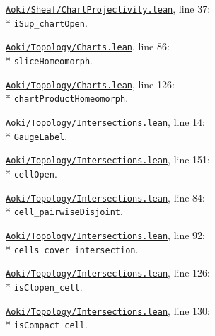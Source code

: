 \begin{leansources}
\item \href{../../../lean/Aoki/Sheaf/ChartProjectivity.lean}{\nolinkurl{Aoki/Sheaf/ChartProjectivity.lean}}, line 37:\\*
\nolinkurl{iSup_chartOpen}.
\item \href{../../../lean/Aoki/Topology/Charts.lean}{\nolinkurl{Aoki/Topology/Charts.lean}}, line 86:\\*
\nolinkurl{sliceHomeomorph}.
\item \href{../../../lean/Aoki/Topology/Charts.lean}{\nolinkurl{Aoki/Topology/Charts.lean}}, line 126:\\*
\nolinkurl{chartProductHomeomorph}.
\item \href{../../../lean/Aoki/Topology/Intersections.lean}{\nolinkurl{Aoki/Topology/Intersections.lean}}, line 14:\\*
\nolinkurl{GaugeLabel}.
\item \href{../../../lean/Aoki/Topology/Intersections.lean}{\nolinkurl{Aoki/Topology/Intersections.lean}}, line 151:\\*
\nolinkurl{cellOpen}.
\item \href{../../../lean/Aoki/Topology/Intersections.lean}{\nolinkurl{Aoki/Topology/Intersections.lean}}, line 84:\\*
\nolinkurl{cell_pairwiseDisjoint}.
\item \href{../../../lean/Aoki/Topology/Intersections.lean}{\nolinkurl{Aoki/Topology/Intersections.lean}}, line 92:\\*
\nolinkurl{cells_cover_intersection}.
\item \href{../../../lean/Aoki/Topology/Intersections.lean}{\nolinkurl{Aoki/Topology/Intersections.lean}}, line 126:\\*
\nolinkurl{isClopen_cell}.
\item \href{../../../lean/Aoki/Topology/Intersections.lean}{\nolinkurl{Aoki/Topology/Intersections.lean}}, line 130:\\*
\nolinkurl{isCompact_cell}.
\end{leansources}

